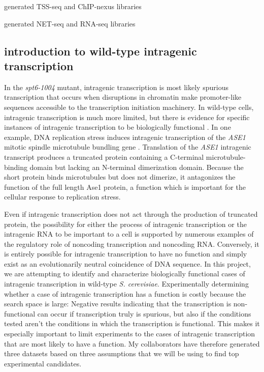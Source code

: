 \documentclass[9pt, letterpaper]{article}
\begin{document}
\begin{description}[align=right, labelwidth=5cm, noitemsep]
    \item [Steve Doris] generated TSS-seq and ChIP-nexus libraries
    \item [Blake Tye] generated NET-seq and RNA-seq libraries
\end{description}

\subsection{introduction to wild-type intragenic transcription}

In the \textit{spt6-1004} mutant, intragenic transcription is most likely spurious transcription that occurs when disruptions in chromatin make promoter-like sequences accessible to the transcription initiation machinery. In wild-type cells, intragenic transcription is much more limited, but there is evidence for specific instances of intragenic transcription to be biologically functional \cite{mcknight2014, gammie1999}. In one example, DNA replication stress induces intragenic transcription of the \textit{ASE1} mitotic spindle microtubule bundling gene \cite{mcknight2014}. Translation of the \textit{ASE1} intragenic transcript produces a truncated protein containing a C-terminal microtubule-binding domain but lacking an N-terminal dimerization domain. Because the short protein binds microtubules but does not dimerize, it antagonizes the function of the full length Ase1 protein, a function which is important for the cellular response to replication stress.

Even if intragenic transcription does not act through the production of truncated protein, the possibility for either the process of intragenic transcription or the intragenic RNA to be important to a cell is supported by numerous examples of the regulatory role of noncoding transcription and noncoding RNA. Conversely, it is entirely possible for intragenic transcription to have no function and simply exist as an evolutionarily neutral coincidence of DNA sequence. In this project, we are attempting to identify and characterize biologically functional cases of intragenic transcription in wild-type \textit{S. cerevisiae}. Experimentally determining whether a case of intragenic transcription has a function is costly because the search space is large: Negative results indicating that the transcription is non-functional can occur if transcription truly is spurious, but also if the conditions tested aren't the conditions in which the transcription is functional. This makes it especially important to limit experiments to the cases of intragenic transcription that are most likely to have a function. My collaborators have therefore generated three datasets based on three assumptions that we will be using to find top experimental candidates.
\end{document}
